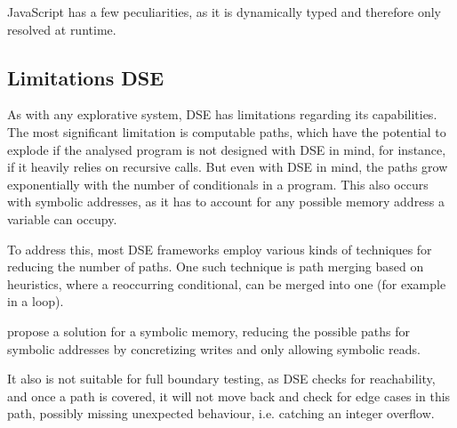 JavaScript has a few peculiarities, as it is dynamically typed and therefore only resolved at runtime. 

\subsection{Limitations DSE}

As with any explorative system, DSE has limitations regarding its capabilities. 
The most significant limitation is computable paths, which have the potential to explode if the analysed program is not designed with DSE in mind, for instance, if it heavily relies on recursive calls. 
But even with DSE in mind, the paths grow exponentially with the number of conditionals in a program.  \cite{cadar_symbolic_2013}
This also occurs with symbolic addresses, as it has to account for any possible memory address a variable can occupy.\cite{elkarablieh_precise_2009}  

To address this, most DSE frameworks employ various kinds of techniques for reducing the number of paths. 
One such technique is path merging based on heuristics, where a reoccurring conditional, can be merged into one (for example in a loop).\cite{kuznetsov_efficient_2012}

\citet{cha_unleashing_2012} propose a solution for a symbolic memory, reducing the possible paths for symbolic addresses by concretizing writes and only allowing symbolic reads.    

It also is not suitable for full boundary testing, as DSE checks for reachability, and once a path is covered, it will not move back and check for edge cases in this path, possibly missing unexpected behaviour, i.e. catching an integer overflow.\cite{berthier_efficient_2023}




